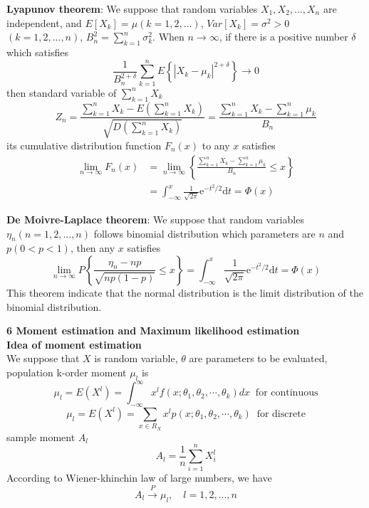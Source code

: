 \documentclass[10pt,a4paper,oneside]{beamer}
\begin{document}
\begin{frame}
\vspace{0.3cm}
{\bfseries Lyapunov theorem}: We suppose that random variables $X_1,X_2,...,X_n$ are independent, and  $E[X_k]=\mu(k=1,2,...)$, $Var[X_k]=\sigma^2>0$ $(k=1,2,...,n)$,  $B_{n}^{2}=\sum_{k=1}^{n} \sigma_{k}^{2}$. When $n \rightarrow \infty$, if there is a positive number $\delta$ which satisfies
\[
\frac{1}{B_{n}^{2+\delta}} \sum_{k=1}^{n} E\left\{\left|X_{k}-\mu_{k}\right|^{2+\delta}\right\} \rightarrow 0
\]
then standard variable of  $\sum_{k=1}^{n}X_k$
\[
Z_{n}=\frac{\sum_{k=1}^{n} X_{k}-E\left(\sum_{k=1}^{n} X_{k}\right)}{\sqrt{D\left(\sum_{k=1}^{n} X_{k}\right)}}=\frac{\sum_{k=1}^{n} X_{k}-\sum_{k=1}^{n} \mu_{k}}{B_{n}}
\]
its cumulative distribution function $F_n(x)$ to any $x$ satisfies
\[
\begin{aligned} \lim _{n \rightarrow \infty} F_{n}(x) &=\lim _{n \rightarrow \infty}\left\{\frac{\sum_{k=1}^{n} X_{k}-\sum_{k=1}^{n} \mu_{k}}{B_{n}} \leqslant x\right\} \\ &=\int_{-\infty}^{x} \frac{1}{\sqrt{2 \pi}} \mathrm{e}^{-t^{2} / 2} \mathrm{d} t=\Phi(x) \end{aligned}
\]
\end{frame}
\begin{frame}
\vspace{0.3cm}
{\bfseries De Moivre-Laplace theorem}: We suppose that random variables $\eta_n(n=1,2,...,n)$ follows binomial distribution which parameters are $n$ and $p(0<p<1)$, then any $x$ satisfies
\[
\lim _{n \rightarrow \infty} P\left\{\frac{\eta_{n}-n p}{\sqrt{n p(1-p)}} \leqslant x\right\}=\int_{-\infty}^{x} \frac{1}{\sqrt{2 \pi}} \mathrm{e}^{-t^{2} / 2} \mathrm{d} t=\Phi(x)
\]
This theorem indicate that the normal distribution is the limit distribution of the binomial distribution.
\end{frame}
\begin{frame}
\vspace{0.3cm}
{\bfseries 6 Moment estimation and Maximum likelihood estimation} 
\vspace{0.3cm}
\\{\bfseries Idea of moment estimation}
\vspace{0.2cm}
\\We suppose that $X$ is random variable, $\theta$ are parameters to be evaluated, population k-order moment $\mu_{l}$ is
\[
\mu_{l}=E\left(X^{l}\right)=\int_{-\infty}^{\infty} x^{l} f\left(x ; \theta_{1}, \theta_{2}, \cdots, \theta_{k}\right) d x \ \text{  for continuous}
\]
\[
\mu_{l}=E\left(X^{l}\right)=\sum_{x \in R_{X}} x^{l} p\left(x ; \theta_{1}, \theta_{2}, \cdots, \theta_{k}\right) \ \text{ for discrete}
\]
sample moment $A_l$ 
\[
A_{l}=\frac{1}{n} \sum_{i=1}^{n} X_{i}^{l}
\]
According to Wiener-khinchin law of large numbers, we have
\[
A_{l}\stackrel{P}{\longrightarrow} \mu_{l}, \quad l=1,2,...,n
\]
\end{frame}
\end{document}
